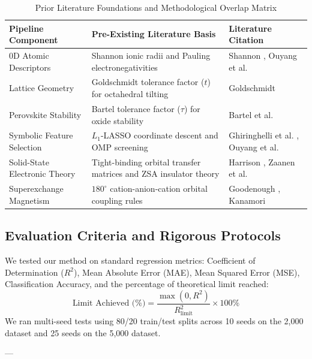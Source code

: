 \documentclass[12pt,onecolumn]{elsarticle}
\begin{document}
\begin{table}[H]
\centering
\caption{Prior Literature Foundations and Methodological Overlap Matrix}
\label{tab:overlap_matrix}
\small
\begin{tabularx}{\textwidth}{p{} p{} X}
\toprule
\textbf{Pipeline Component} & \textbf{Pre-Existing Literature Basis} & \textbf{Literature Citation} \\
\midrule
0D Atomic Descriptors & Shannon ionic radii and Pauling electronegativities & Shannon \cite{shannon1976revised}, Ouyang et al. \cite{ouyang2018sisso} \\
Lattice Geometry & Goldschmidt tolerance factor ($t$) for octahedral tilting & Goldschmidt \cite{goldschmidt1926gesetze} \\
Perovskite Stability & Bartel tolerance factor ($\tau$) for oxide stability & Bartel et al. \cite{bartel2019new, bartel2019sciadv} \\
Symbolic Feature Selection & $L_1$-LASSO coordinate descent and OMP screening & Ghiringhelli et al. \cite{ghiringhelli2015bigdata}, Ouyang et al. \cite{ouyang2018sisso} \\
Solid-State Electronic Theory & Tight-binding orbital transfer matrices and ZSA insulator theory & Harrison \cite{harrison1999elementary}, Zaanen et al. \cite{zaanen1985band} \\
Superexchange Magnetism & $180^\circ$ cation-anion-cation orbital coupling rules & Goodenough \cite{goodenough1955theory}, Kanamori \cite{kanamori1959superexchange} \\
\bottomrule
\end{tabularx}
\end{table}

\subsection{Evaluation Criteria and Rigorous Protocols}
We tested our method on standard regression metrics: Coefficient of Determination ($R^2$), Mean Absolute Error (MAE), Mean Squared Error (MSE), Classification Accuracy, and the percentage of theoretical limit reached:
\begin{equation}
\text{Limit Achieved (\%)} = \frac{\max(0, R^2)}{R^2_{\text{limit}}} \times 100\%
\end{equation}
We ran multi-seed tests using 80/20 train/test splits across 10 seeds on the 2,000 dataset and 25 seeds on the 5,000 dataset.

---
\end{document}
